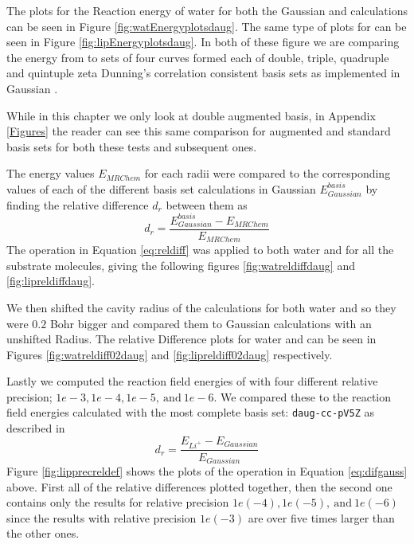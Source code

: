\documentclass[../master_thesis.tex]{subfiles}
\begin{document}
The plots for the Reaction energy of water for
both the Gaussian and  \mrchem calculations can be seen in Figure \ref{fig:watEnergyplotsdaug}.
The same type of plots for  can be seen in Figure \ref{fig:lipEnergyplotsdaug}.
In both of these figure we are comparing the energy from \mrchem to sets of four
curves formed each of double, triple, quadruple and quintuple zeta Dunning's correlation
consistent \cite{doi:10.1063/1.456153} basis sets as implemented in Gaussian \cite{G09}.

While in this chapter we only look at double augmented basis, in Appendix \ref{Figures}
the reader can see this same comparison for augmented and standard basis sets for
both these tests and subsequent ones.

The \mrchem energy values $E_{MRChem}$ for each radii were compared to the
corresponding values of each of the different basis set calculations in
Gaussian  $E_{Gaussian}^{basis}$ by finding the relative difference $d_r$
between them as
\begin{equation}\label{eq:reldiff}
  d_r = \frac{E_{Gaussian}^{basis} - E_{MRChem}}{E_{MRChem}}
\end{equation}
The operation in Equation \ref{eq:reldiff} was applied to both water and  for all the
substrate molecules, giving the following figures \ref{fig:watreldiffdaug} and \ref{fig:lipreldiffdaug}.

We then shifted the cavity radius of the \mrchem calculations for both water and
 so they were $0.2$ Bohr bigger and compared them to Gaussian calculations
with an unshifted Radius. The relative Difference plots for water and  can be seen
in Figures \ref{fig:watreldiff02daug} and \ref{fig:lipreldiff02daug} respectively.

Lastly we computed the reaction field energies of  with four different
relative precision; $1e-3, 1e-4, 1e-5,\  \text{and}\  1e-6$. We compared these
to the reaction field energies calculated with the most complete basis set:
\verb!daug-cc-pV5Z! as described in
\begin{equation}\label{eq:difgauss}
  d_r = \frac{E_{Li^+} - E_{Gaussian}}{E_{Gaussian}}
\end{equation}
Figure \ref{fig:lipprecreldef} shows the plots of the operation in Equation \ref{eq:difgauss} above.
First all of the relative differences plotted together, then the second one contains
only the results for relative precision $1e(-4), 1e(-5),\  \text{and}\  1e(-6)$ since
the results with relative precision $1e(-3)$ are over five times larger than the other ones.
\end{document}
